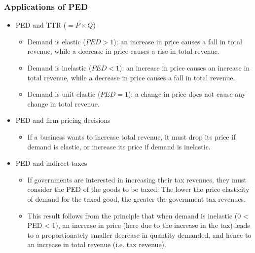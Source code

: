 \documentclass[a4paper,12pt]{article}
\begin{document}
\subsubsection*{Applications of PED}
\begin{itemize}
  \item PED and TTR ($=P\times Q$)
  \begin{itemize}
    \item Demand is elastic ($PED>1$): an increase in price causes a fall in total revenue, while a decrease in price causes a rise in total revenue. 
    \item Demand is inelastic ($PED<1$): an increase in price causes an increase in total revenue, while a decrease in price causes a fall in total revenue.
    \item Demand is unit elastic ($PED=1$): a change in price does not cause any change in total revenue.
  \end{itemize}
  \item PED and firm pricing decisions
  \begin{itemize}
    \item If a business wants to increase total revenue, it must drop its price if demand is elastic, or increase its price if demand is inelastic.
  \end{itemize}
  \item PED and indirect taxes
  \begin{itemize}
    \item If governments are interested in increasing their tax revenues, they must consider the PED of the goods to be taxed: The lower the price elasticity of demand for the taxed good, the greater the government tax revenues.
    \item This result follows from the principle that when demand is inelastic (0 < PED < 1), an increase in price (here due to the increase in the tax) leads to a proportionately smaller decrease in quantity demanded, and hence to an increase in total revenue (i.e. tax revenue).
  \end{itemize}
\end{itemize}
\end{document}

